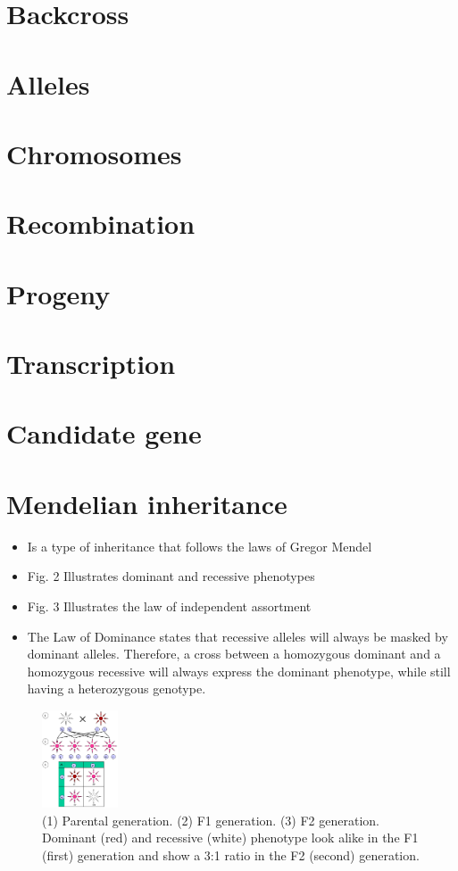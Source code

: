 \documentclass[a4paper]{article}
\begin{document}
\section{Backcross}
\label{sec-18}
\section{Alleles}
\label{sec-19}
\section{Chromosomes}
\label{sec-20}
\section{Recombination}
\label{sec-21}
\section{Progeny}
\label{sec-22}
\section{Transcription}
\label{sec-23}
\section{Candidate gene}
\label{sec-24}
\section{Mendelian inheritance}
\label{sec-25}
\begin{itemize}
\item Is a type of inheritance that follows the laws of Gregor Mendel
\item Fig. 2 Illustrates dominant and recessive phenotypes
\item Fig. 3 Illustrates the law of independent assortment
\item The Law of Dominance states that recessive alleles will always be masked by dominant alleles. Therefore, a cross between a homozygous dominant and a homozygous recessive will always express the dominant phenotype, while still having a heterozygous genotype.
\end{itemize}
\begin{figure}[htb]
\centering
\includegraphics[width=0.2\textwidth,height=0.3\textwidth]{./images/mendel.png}
\caption{\label{fig:Mendel}(1) Parental generation. (2) F1 generation. (3) F2 generation. Dominant (red) and recessive (white) phenotype look alike in the F1 (first) generation and show a 3:1 ratio in the F2 (second) generation.}
\end{figure}
\end{document}
